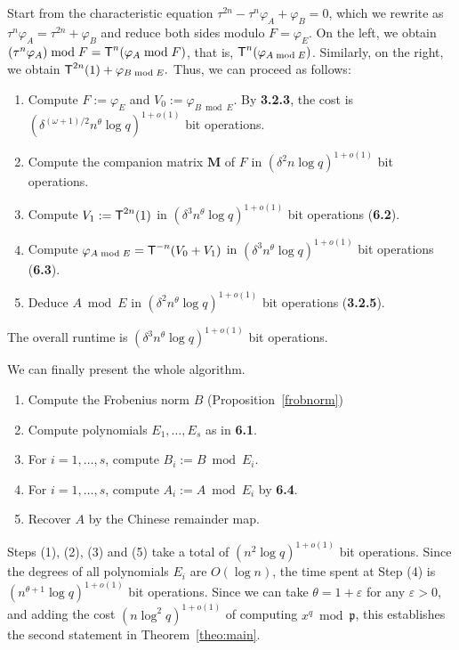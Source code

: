 \documentclass[sigconf]{acmart}
\newcommand{\frakp}{\mathfrak{p}}
\begin{document}
Start from the characteristic equation $\tau^{2n} - \tau^n \varphi_A +
\varphi_B=0$, which we rewrite as $\tau^n \varphi_A = \tau^{2n} +
\varphi_B$ and reduce both sides modulo $F=\varphi_E$. On the left, we
obtain $(\tau^n \varphi_A) \bmod F = \text{\sf T}^n(\varphi_A \bmod
F)$, that is, $\text{\sf T}^n(\varphi_{A \bmod E})$. Similarly, on the
right, we obtain $\text{\sf T}^{2n}(1) + \varphi_{B \bmod E}.$ Thus, we can
proceed as follows:
\begin{enumerate}
\item Compute $F:=\varphi_E$ and $V_0:=\varphi_{B \bmod E}$. By
  {\bf 3.2.3}, the cost is
  $(\delta^{(\omega+1)/2} n^\theta \log q)^{1+o(1)}$ bit operations.
\item Compute the companion matrix ${\bm M}$ of $F$ in 
  $(\delta^2 n \log q)^{1+o(1)}$ bit operations.
\item Compute $V_1:=\text{\sf T}^{2n}(1)$ in $(\delta^3 n^\theta \log
  q)^{1+o(1)}$ bit operations ({\bf 6.2}).
\item Compute $\varphi_{A \bmod E}=\text{\sf T}^{-n}(V_0+V_1)$ in $(\delta^3
  n^\theta \log q)^{1+o(1)}$ bit operations ({\bf 6.3}).
\item Deduce $A \bmod E$ in $(\delta^2 n^\theta \log q)^{1+o(1)}$ bit
  operations ({\bf 3.2.5}).
\end{enumerate}
The overall runtime is $(\delta^3 n^\theta \log q)^{1+o(1)}$ bit
operations.

\smallskip{} We can finally present the
whole algorithm. 
\begin{enumerate}
\item Compute the Frobenius norm $B$ (Proposition~\ref{frobnorm})
\item Compute polynomials $E_1,\dots,E_s$ as in {\bf 6.1}.
\item For $i=1,\dots,s$, compute $B_i:=B \bmod E_i$.
\item For $i=1,\dots,s$, compute $A_i:=A \bmod E_i$ by {\bf 6.4}.
\item Recover $A$ by the Chinese remainder map.
\end{enumerate}
Steps (1), (2), (3) and (5) take a total of $(n^2 \log q)^{1+o(1)}$
bit operations. Since the degrees of all polynomials $E_i$ are $O(\log
n)$, the time spent at Step (4) is $(n^{\theta+1} \log
q)^{1+o(1)}$ bit operations. Since we can take $\theta = 1+\varepsilon$ 
for any $\varepsilon > 0$, and adding the cost
$(n \log^2 q)^{1+o(1)}$
 of computing $x^q \bmod \frakp$, 
this establishes the second statement in Theorem~\ref{theo:main}.
\end{document}
